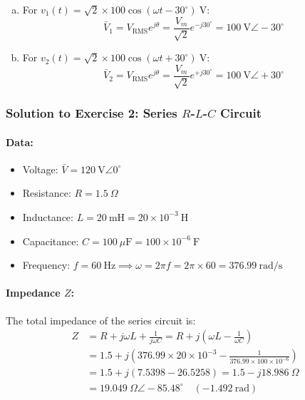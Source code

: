 \begin{enumerate}[(a)]
    \item For $v_1(t) = \sqrt{2} \times 100 \cos(\omega t - 30^\circ)\ \text{V}$:
    \begin{equation}
        \boxed{\bar{V}_1 = V_{\text{RMS}} e^{j\theta} = \frac{V_m}{\sqrt{2}} e^{-j 30^\circ} = 100\ \text{V} \angle -30^\circ}
    \end{equation}

    \item For $v_2(t) = \sqrt{2} \times 100 \cos(\omega t + 30^\circ)\ \text{V}$:
    \begin{equation}
        \boxed{\bar{V}_2 = V_{\text{RMS}} e^{j\theta} = \frac{V_m}{\sqrt{2}} e^{+j 30^\circ} = 100\ \text{V} \angle +30^\circ}
    \end{equation}
\end{enumerate}

\subsubsection*{Solution to Exercise 2: Series $R$-$L$-$C$ Circuit}
\paragraph{Data:}
\begin{itemize}
    \item Voltage: $\bar{V} = 120\ \text{V}\angle 0^\circ$
    \item Resistance: $R = 1.5\ \Omega$
    \item Inductance: $L = 20\ \text{mH} = 20 \times 10^{-3}\ \text{H}$
    \item Capacitance: $C = 100\ \mu\text{F} = 100 \times 10^{-6}\ \text{F}$
    \item Frequency: $f = 60\ \text{Hz} \implies \omega = 2\pi f = 2\pi \times 60 = 376.99\ \text{rad/s}$
\end{itemize}

\paragraph{Impedance $Z$:}
The total impedance of the series circuit is:
\begin{align}
    Z &= R + j\omega L + \frac{1}{j\omega C} = R + j\left(\omega L - \frac{1}{\omega C}\right) \nonumber\\
      &= 1.5 + j\left(376.99 \times 20 \times 10^{-3} - \frac{1}{376.99 \times 100 \times 10^{-6}}\right) \nonumber\\
      &= 1.5 + j(7.5398 - 26.5258) = 1.5 - j18.986\ \Omega \nonumber\\
      &= 19.049\ \Omega \angle -85.48^\circ\quad (-1.492\ \text{rad})
\end{align}

